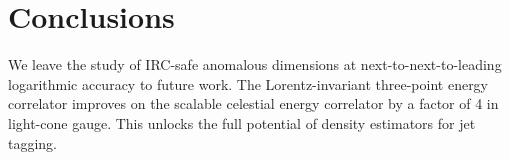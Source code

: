 \section{Conclusions}\label{sec:conclusions}

We leave the study of IRC-safe anomalous dimensions at
next-to-next-to-leading logarithmic accuracy to future work. The
Lorentz-invariant three-point energy correlator improves on the scalable
celestial energy correlator by a factor of 4 in light-cone gauge. This
unlocks the full potential of density estimators for jet tagging.

